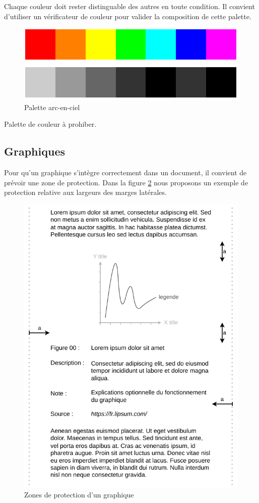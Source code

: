 \documentclass[a4paper,12pt]{article}
\begin{document}
\begin{multicols}{2}
Chaque couleur doit rester distinguable des autres en toute condition.\autocite{wilkeRedundantCoding2019} Il convient d'utiliser un vérificateur de couleur pour valider la composition de cette palette.\autocite{andreaskrauseBestPracticesData2024}

\begin{figure}[H]
\centering
\includegraphics[width=.9\linewidth]{./img/palette-arc-en-ciel.pdf}
\caption{\label{fig:org161c301}Palette arc-en-ciel}
\end{figure}

Palette de couleur à prohiber.\autocite{wilkeCommonPitfallsColor2019}
\subsection*{Graphiques}
\label{sec:org19da333}
Pour qu'un graphique s'intègre correctement dans un document, il convient de prévoir une zone de protection. Dans la figure \ref{fig:org0534c31} nous proposons un exemple de protection relative aux largeurs des marges latérales.

\begin{figure}[H]
\centering
\includegraphics[width=.9\linewidth]{./img/general-graphics-rules.pdf}
\caption{\label{fig:org0534c31}Zones de protection d'un graphique}
\end{figure}

\end{multicols}
\end{document}
